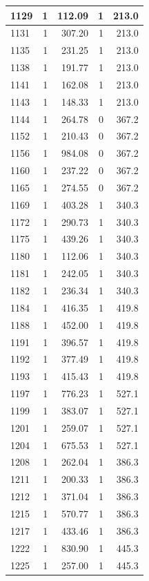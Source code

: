 \documentclass[
  spanish,
  12pt,
]{book}
\begin{document}
\begin{tabular}{l|r|r|r|r}
\hline
1129 & 1 & 112.09 & 1 & 213.0\\
\hline
1131 & 1 & 307.20 & 1 & 213.0\\
\hline
1135 & 1 & 231.25 & 1 & 213.0\\
\hline
1138 & 1 & 191.77 & 1 & 213.0\\
\hline
1141 & 1 & 162.08 & 1 & 213.0\\
\hline
1143 & 1 & 148.33 & 1 & 213.0\\
\hline
1144 & 1 & 264.78 & 0 & 367.2\\
\hline
1152 & 1 & 210.43 & 0 & 367.2\\
\hline
1156 & 1 & 984.08 & 0 & 367.2\\
\hline
1160 & 1 & 237.22 & 0 & 367.2\\
\hline
1165 & 1 & 274.55 & 0 & 367.2\\
\hline
1169 & 1 & 403.28 & 1 & 340.3\\
\hline
1172 & 1 & 290.73 & 1 & 340.3\\
\hline
1175 & 1 & 439.26 & 1 & 340.3\\
\hline
1180 & 1 & 112.06 & 1 & 340.3\\
\hline
1181 & 1 & 242.05 & 1 & 340.3\\
\hline
1182 & 1 & 236.34 & 1 & 340.3\\
\hline
1184 & 1 & 416.35 & 1 & 419.8\\
\hline
1188 & 1 & 452.00 & 1 & 419.8\\
\hline
1191 & 1 & 396.57 & 1 & 419.8\\
\hline
1192 & 1 & 377.49 & 1 & 419.8\\
\hline
1193 & 1 & 415.43 & 1 & 419.8\\
\hline
1197 & 1 & 776.23 & 1 & 527.1\\
\hline
1199 & 1 & 383.07 & 1 & 527.1\\
\hline
1201 & 1 & 259.07 & 1 & 527.1\\
\hline
1204 & 1 & 675.53 & 1 & 527.1\\
\hline
1208 & 1 & 262.04 & 1 & 386.3\\
\hline
1211 & 1 & 200.33 & 1 & 386.3\\
\hline
1212 & 1 & 371.04 & 1 & 386.3\\
\hline
1215 & 1 & 570.77 & 1 & 386.3\\
\hline
1217 & 1 & 433.46 & 1 & 386.3\\
\hline
1222 & 1 & 830.90 & 1 & 445.3\\
\hline
1225 & 1 & 257.00 & 1 & 445.3\\

\end{tabular}
\end{document}
